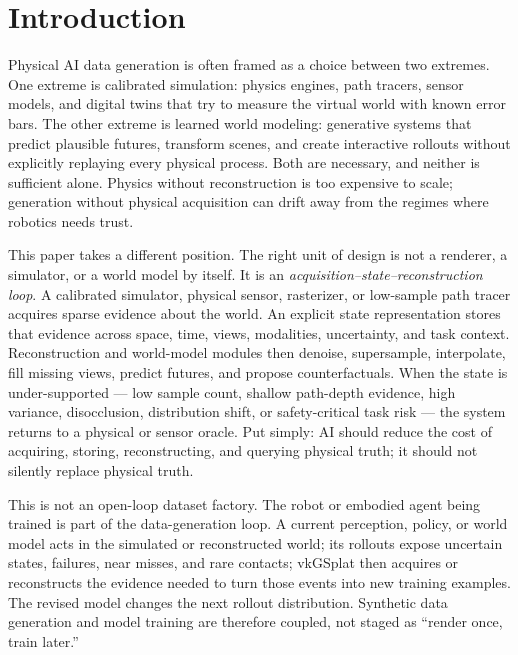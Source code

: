 \documentclass[10pt,journal,onecolumn]{IEEEtran}
\begin{document}
\section{Introduction}

Physical AI data generation is often framed as a choice between two extremes.
One extreme is calibrated simulation: physics engines, path tracers, sensor
models, and digital twins that try to measure the virtual world with known error
bars. The other extreme is learned world modeling: generative systems that
predict plausible futures, transform scenes, and create interactive rollouts
without explicitly replaying every physical process. Both are necessary, and
neither is sufficient alone. Physics without reconstruction is too expensive to
scale; generation without physical acquisition can drift away from the regimes
where robotics needs trust.

This paper takes a different position. The right unit of design is not a
renderer, a simulator, or a world model by itself. It is an
\emph{acquisition--state--reconstruction loop}. A calibrated simulator,
physical sensor, rasterizer, or low-sample path tracer acquires sparse evidence
about the world. An explicit state representation stores that evidence across
space, time, views, modalities, uncertainty, and task context. Reconstruction
and world-model modules then denoise, supersample, interpolate, fill missing
views, predict futures, and propose counterfactuals. When the state is
under-supported --- low sample count, shallow path-depth evidence, high
variance, disocclusion, distribution shift, or safety-critical task risk --- the
system returns to a physical or sensor oracle. Put simply: AI should reduce the
cost of acquiring, storing, reconstructing, and querying physical truth; it
should not silently replace physical truth.

This is not an open-loop dataset factory. The robot or embodied agent being
trained is part of the data-generation loop. A current perception, policy, or
world model acts in the simulated or reconstructed world; its rollouts expose
uncertain states, failures, near misses, and rare contacts; vkGSplat then
acquires or reconstructs the evidence needed to turn those events into new
training examples. The revised model changes the next rollout distribution.
Synthetic data generation and model training are therefore coupled, not staged as
``render once, train later.''
\end{document}

